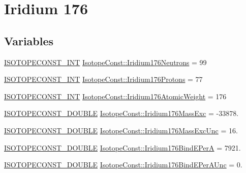 \hypertarget{group___isotope_const-_iridium-_ir176}{}\section{Iridium 176}
\label{group___isotope_const-_iridium-_ir176}
\subsection*{Variables}
\begin{DoxyCompactItemize}
\item 
\mbox{\hyperlink{group___isotope_const-_macros_ga5f18360b3e99483a35c32d789e62621c}{I\+S\+O\+T\+O\+P\+E\+C\+O\+N\+S\+T\+\_\+\+I\+NT}} \mbox{\hyperlink{group___isotope_const-_iridium-_ir176_gacdc1cf54591f6f950c6f6819e3749c87}{Isotope\+Const\+::\+Iridium176\+Neutrons}} = 99
\item 
\mbox{\hyperlink{group___isotope_const-_macros_ga5f18360b3e99483a35c32d789e62621c}{I\+S\+O\+T\+O\+P\+E\+C\+O\+N\+S\+T\+\_\+\+I\+NT}} \mbox{\hyperlink{group___isotope_const-_iridium-_ir176_ga789f0eff6ce037056a4beaee39ec003c}{Isotope\+Const\+::\+Iridium176\+Protons}} = 77
\item 
\mbox{\hyperlink{group___isotope_const-_macros_ga5f18360b3e99483a35c32d789e62621c}{I\+S\+O\+T\+O\+P\+E\+C\+O\+N\+S\+T\+\_\+\+I\+NT}} \mbox{\hyperlink{group___isotope_const-_iridium-_ir176_ga9985649f41895f6317adb74c6a0c07bb}{Isotope\+Const\+::\+Iridium176\+Atomic\+Weight}} = 176
\item 
\mbox{\hyperlink{group___isotope_const-_macros_ga8f45a7272ce02c0b4c65c44636ed719a}{I\+S\+O\+T\+O\+P\+E\+C\+O\+N\+S\+T\+\_\+\+D\+O\+U\+B\+LE}} \mbox{\hyperlink{group___isotope_const-_iridium-_ir176_ga4fab23d501c8fc47361543f431179d97}{Isotope\+Const\+::\+Iridium176\+Mass\+Exc}} = -\/33878.
\item 
\mbox{\hyperlink{group___isotope_const-_macros_ga8f45a7272ce02c0b4c65c44636ed719a}{I\+S\+O\+T\+O\+P\+E\+C\+O\+N\+S\+T\+\_\+\+D\+O\+U\+B\+LE}} \mbox{\hyperlink{group___isotope_const-_iridium-_ir176_ga343b2a22df58ff80d1c478f3c8fa8f5f}{Isotope\+Const\+::\+Iridium176\+Mass\+Exc\+Unc}} = 16.
\item 
\mbox{\hyperlink{group___isotope_const-_macros_ga8f45a7272ce02c0b4c65c44636ed719a}{I\+S\+O\+T\+O\+P\+E\+C\+O\+N\+S\+T\+\_\+\+D\+O\+U\+B\+LE}} \mbox{\hyperlink{group___isotope_const-_iridium-_ir176_gac8f8cf8a96252f28c40b0844c0026812}{Isotope\+Const\+::\+Iridium176\+Bind\+E\+PerA}} = 7921.
\item 
\mbox{\hyperlink{group___isotope_const-_macros_ga8f45a7272ce02c0b4c65c44636ed719a}{I\+S\+O\+T\+O\+P\+E\+C\+O\+N\+S\+T\+\_\+\+D\+O\+U\+B\+LE}} \mbox{\hyperlink{group___isotope_const-_iridium-_ir176_ga1b6997e208db03914d7c1ccb43263e53}{Isotope\+Const\+::\+Iridium176\+Bind\+E\+Per\+A\+Unc}} = 0.

\end{DoxyCompactItemize}
